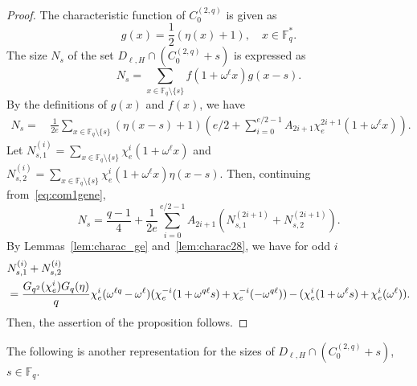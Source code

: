 \documentclass[10pt]{amsart}
\theoremstyle{definition}
\newcommand*\F{{\mathbb F}}
\newcommand*{\mk}{\mkern -1mu}
\begin{document}
\begin{proof}
The characteristic function of $C_0^{(2,q)}$ is given as
\[
g(x)=\frac{1}{2}(\eta(x)+1), \quad x\in \F_q^\ast.
\]
The size $N_s$ of the set $D_{\ell,H}\cap (C_0^{(2,q)}+s)$ is expressed as
\[
N_s=\sum_{x\in \F_q\setminus \{s\}}f(1+\omega^\ell x)g(x-s).
\]
By the definitions of $g(x)$ and $f(x)$, we have
\begin{align}
N_s =&\,\frac{1}{2e}\sum_{x\in \F_q\setminus \{s\}}(\eta(x-s)+1)\left(e/2+\sum_{i=0}^{e/2-1}A_{2i+1}\chi_e^{2i+1}(1+\omega^\ell x)\right). \label{eq:com1gene}
\end{align}
Let $N_{s,1}^{(i)}=\sum_{x\in \F_q\setminus \{s\}}\chi_e^i(1+\omega^\ell x)$ and $N_{s,2}^{(i)}=\sum_{x\in \F_q\setminus \{s\}}\chi_e^i(1+\omega^\ell x)\eta(x-s)$. Then, continuing from~\eqref{eq:com1gene},
\[
N_s=
\frac{q-1}{4}+\frac{1}{2e}\sum_{i=0}^{e/2-1}A_{2i+1}(N_{s,1}^{(2i+1)}+N_{s,2}^{(2i+1)}).
\]
By Lemmas~\ref{lem:charac_ge} and~\ref{lem:charac28}, we have for odd $i$
\begin{align*}
&N_{s,1}^{(i)}+N_{s,2}^{(i)}\\
&=\frac{G_{q^2}(\chi_e^i)G_q(\eta)}{q}\chi_e^i(\omega^{\ell q}\mk-\mk\omega^\ell) (\chi_e^{-i}(1\mk+\mk\omega^{q\ell} s)\mk+\mk\chi_e^{-i}(-\omega^{q\ell})) \mk-\mk(\chi_e^i(1\mk+\mk\omega^\ell s)\mk+\mk\chi_e^i(\omega^\ell)).
\end{align*}
Then, the assertion of the proposition follows.
\end{proof}

The following is another representation for the sizes of $D_{\ell,H}\cap (C_0^{(2,q)}+s)$, $s\in \F_q$.
\end{document}
